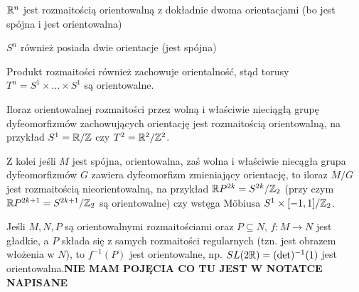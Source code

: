 \begin{example}
\item $\mathbb{R}^n$ jest rozmaitością orientowalną z dokładnie dwoma orientacjami (bo jest spójna i jest orientowalna)
\item $S^n$ również posiada dwie orientacje (jest spójna)
\item Produkt rozmaitości również zachowuje orientalność, stąd torusy $T^n=S^1\times...\times S^1$ są orientowalne.
\item Iloraz orientowalnej rozmaitości przez wolną i właściwie nieciągłą grupę dyfeomorfizmów zachowujących orientację jest rozmaitością orientowalną, na przykład $S^1=\mathbb{R}/\mathbb{Z}$ czy $T^2=\mathbb{R}^2/\mathbb{Z}^2$. 

  Z kolei jeśli $M$ jest spójna, orientowalna, zaś wolna i właściwie niecągła grupa dyfeomorfizmów $G$ zawiera dyfeomorfizm zmieniający orientację, to iloraz $M/G$ jest rozmaitością nieorientowalną, na przykład $\mathbb{R} P^{2k}=S^{2k}/\mathbb{Z}_2$ (przy czym $\mathbb{R} P^{2k+1}=S^{2k+1}/\mathbb{Z}_2$ są orientowalne) czy wstęga M\"obiusa $S^1\times [-1,1]/\mathbb{Z}_2$.
\item Jeśli $M,N,P$ są orientowalnymi rozmaitościami oraz $P\subseteq N$, $f:M\to N$ jest gładkie, a $P$ składa się z samych rozmaitości regularnych (tzn. jest obrazem włożenia w $N$), to $f^{-1}(P)$ jest orientowalne, np. $SL(2\mathbb{R})=(\det)^{-1}(1)$ jest orientowalna.\textbf{\large\color{red}NIE MAM POJĘCIA CO TU JEST W NOTATCE NAPISANE}
\end{example}

